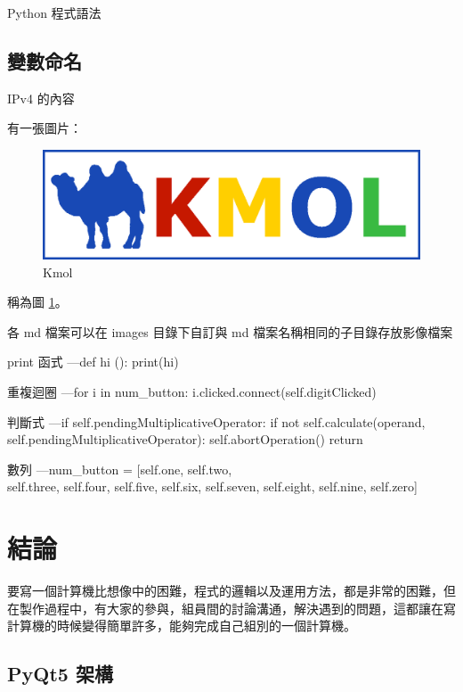 \documentclass[12pt,,]{report}
\begin{document}
Python 程式語法

\hypertarget{ux8b8aux6578ux547dux540d}{%
\section{變數命名}\label{ux8b8aux6578ux547dux540d}}

IPv4 的內容

有一張圖片：

\begin{figure}
\centering
\includegraphics{./tex2pdf.4436/e0ef408d9559203849a0aa26f79f9b032b709c7a.png}
\caption{Kmol\label{fig:駱駝}}
\end{figure}

稱為圖 \ref{fig:駱駝}。

各 md 檔案可以在 images 目錄下自訂與 md 檔案名稱相同的子目錄存放影像檔案

print 函式 ---def hi (): print(hi)

重複迴圈 ---for i in num\_button: i.clicked.connect(self.digitClicked)

判斷式 ---if self.pendingMultiplicativeOperator: if not
self.calculate(operand, self.pendingMultiplicativeOperator):
self.abortOperation() return

數列 ---num\_button = {[}self.one, self.two,\\
self.three, self.four, self.five, self.six, self.seven, self.eight,
self.nine, self.zero{]}

\hypertarget{ux7d50ux8ad6}{%
\chapter{結論}\label{ux7d50ux8ad6}}

要寫一個計算機比想像中的困難，程式的邏輯以及運用方法，都是非常的困難，但在製作過程中，有大家的參與，組員間的討論溝通，解決遇到的問題，這都讓在寫計算機的時候變得簡單許多，能夠完成自己組別的一個計算機。

\hypertarget{pyqt5-ux67b6ux69cb}{%
\section{PyQt5 架構}\label{pyqt5-ux67b6ux69cb}}
\end{document}
